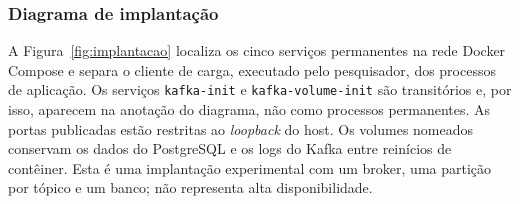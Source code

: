 
\subsubsection{Diagrama de implantação}
A Figura~\ref{fig:implantacao} localiza os cinco serviços permanentes na rede Docker Compose e separa o cliente de carga, executado pelo pesquisador, dos processos de aplicação. Os serviços \texttt{kafka-init} e \texttt{kafka-volume-init} são transitórios e, por isso, aparecem na anotação do diagrama, não como processos permanentes. As portas publicadas estão restritas ao \textit{loopback} do host. Os volumes nomeados conservam os dados do PostgreSQL e os logs do Kafka entre reinícios de contêiner. Esta é uma implantação experimental com um broker, uma partição por tópico e um banco; não representa alta disponibilidade.


\FloatBarrier

